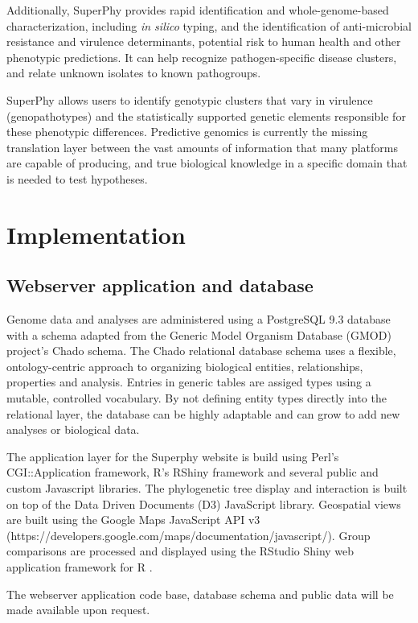 \documentclass{bmcart}
\begin{document}
Additionally, SuperPhy provides rapid identification and whole-genome-based characterization, including \textit{in silico} typing, and the identification of anti-microbial resistance and virulence determinants, potential risk to human health and other phenotypic predictions. It can help recognize pathogen-specific disease clusters, and relate unknown isolates to known pathogroups.

SuperPhy allows users to identify genotypic clusters that vary in virulence (genopathotypes) and the statistically supported genetic elements responsible for these phenotypic differences. Predictive genomics is currently the missing translation layer between the vast amounts of information that many platforms are capable of producing, and true biological knowledge in a specific domain that is needed to test hypotheses.


\section*{Implementation}
\subsection{Webserver application and database}

Genome data and analyses are administered using a PostgreSQL 9.3 database with a schema adapted from the Generic Model Organism Database (GMOD) project's Chado schema. The Chado relational database schema uses a flexible, ontology-centric approach to organizing biological entities, relationships, properties and analysis. Entries in generic tables are assiged types using a mutable, controlled vocabulary. By not defining entity types directly into the relational layer, the database can be highly adaptable and can grow to add new analyses or biological data.

The application layer for the Superphy website is build using Perl's CGI::Application framework, R's RShiny framework and several public and custom Javascript libraries. The phylogenetic tree display and interaction is built on top of the Data Driven Documents (D3) JavaScript library. Geospatial views are built using the Google Maps JavaScript API v3 (https://developers.google.com/maps/documentation/javascript/). Group comparisons are processed and displayed using the RStudio Shiny web application framework for R \cite{}.

The webserver application code base, database schema and public data will be made available upon request.
\end{document}
